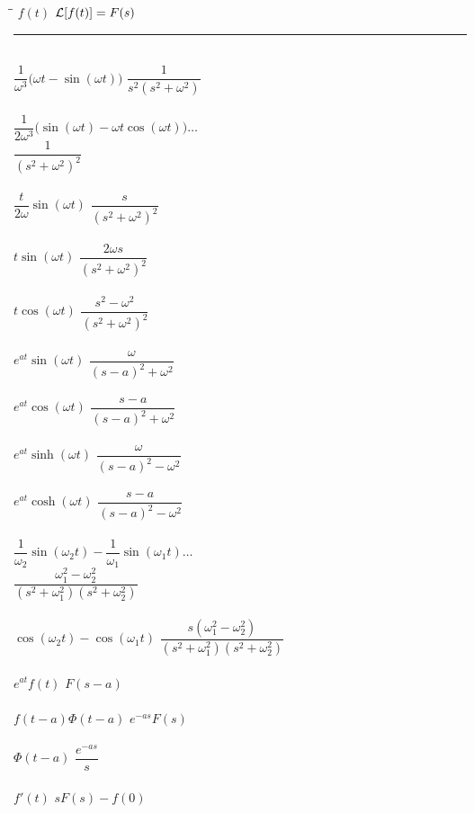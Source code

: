 \documentclass[12pt,letter]{article}
\begin{document}
{\begin{multicols}{2}
			\begin{center}
			\begin{tabbing}
			\hspace*{1.5in}\=\hspace{1.5in}\= \kill
				$f(t)$ \> $\mathcal{L}{\left[f(t)\right]}=F(s)$ \> \\ \noindent\rule{8.0cm}{0.4pt} \\
				$\dfrac{1}{\omega^3}\big(\omega t - \sin(\omega t)\big) $	\> $\dfrac{1}{s^2(s^2+\omega^2)}$	\>\LTNUM \\ \\
				$\dfrac{1}{2\omega^3}\big(\sin(\omega t) - \omega t \cos(\omega t)\big) \dots $	\\ \> $\dfrac{1}{(s^2+\omega^2)^2}$	\>\LTNUM \\ \\
				$\dfrac{t}{2\omega} \sin(\omega t)$	 \> $\dfrac{s}{(s^2+\omega^2)^2}$	\>\LTNUM \\ \\
				$t\sin (\omega t) $  	\> $\dfrac{2\omega s}{(s^2+\omega^2)^2}$ \>\LTNUM \\ \\
				$t\cos (\omega t) $  	\> $\dfrac{s^2-\omega^2}{(s^2+\omega^2)^2}$ \>\LTNUM \\ \\
				$e^{at}\sin (\omega t) $	\> $\dfrac{\omega}{(s-a)^2+\omega^2}$  \>\LTNUM \\ \\
				$e^{at}\cos (\omega t) $	\> $\dfrac{s-a}{(s-a)^2+\omega^2}$  \>\LTNUM \\ \\
				$e^{at}\sinh (\omega t) $	\> $\dfrac{\omega}{(s-a)^2-\omega^2}$  \>\LTNUM \\ \\
				$e^{at}\cosh (\omega t) $	\> $\dfrac{s-a}{(s-a)^2-\omega^2}$  \>\LTNUM \\ \\
				$\dfrac{1}{\omega_2}\sin(\omega_2 t) - \dfrac{1}{\omega_1}\sin (\omega_1 t) \dots $	 \\ \> $\dfrac{\omega_1^2-\omega_2^2}{(s^2+\omega_1^2)(s^2+\omega_2^2)}$	\>\LTNUM \\ \\
				$\cos(\omega_2 t) - \cos (\omega_1 t)  $	\> $\dfrac{s(\omega_1^2-\omega_2^2)}{(s^2+\omega_1^2)(s^2+\omega_2^2)}$	\>\LTNUM \\ \\
				$e^{at}f(t)$	\> $F(s-a)$	\>\LTNUM \\ \\ 
				$f(t-a)\Phi(t-a)$ \> $e^{-as}F(s)$ \>\LTNUM \\ \\
				$\Phi(t-a)$ \> $\dfrac{e^{-as}}{s}$ \>\LTNUM \\ \\
				$f'(t)$ 	\> $sF(s) - f(0)$ \>\LTNUM \\ \\
			\end{tabbing}
			\end{center}
			\end{multicols}
			}
			
\end{document}
